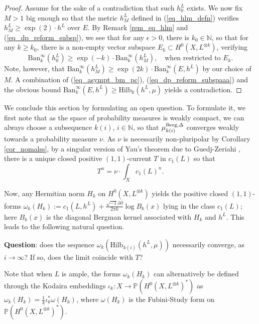 \documentclass[12pt]{article}
\numberwithin{equation}{section}
\theoremstyle{theorem}
\theoremstyle{definition}
\theoremstyle{remark}
\newcommand{\imun} {\sqrt{-1}}
\newcommand{\nat}{\mathbb{N}}
\newcommand{\dbar}{ \overline{\partial} }
\begin{document}
	\begin{proof}
		Assume for the sake of a contradiction that such $h^L_0$ exists.
		We now fix $M > 1$ big enough so that the metric $h^L_M$ defined in (\ref{eq_hlm_defn}) verifies $h^L_M \geq \exp(2) \cdot h^L$ over $E$.
		By Remark \ref{rem_eq_hlm} and (\ref{eq_dp_reform_subsp}), we see that for any $\epsilon > 0$, there is $k_0 \in \nat$, so that for any $k \geq k_0$, there is a non-empty vector subspace $E_k \subset H^0(X, L^{\otimes k})$, verifying 
		\begin{equation}\label{eq_dp_reform_subspaaa}
			{\textrm{Ban}}_k^{\infty}(h^L_0) \geq \exp(-k) \cdot {\textrm{Ban}}_k^{\infty}(h^L_M), \quad \text{when restricted to } E_k.
		\end{equation}
		Note, however, that ${\textrm{Ban}}_k^{\infty}(h^L_M) \geq \exp(2k) \cdot {\textrm{Ban}}_k^{\infty}(E, h^L)$ by our choice of $M$.
		A combination of (\ref{eq_asympt_bm_pc}), (\ref{eq_dp_reform_subspaaa}) and the obvious bound ${\textrm{Ban}}_k^{\infty}(E, h^L)
			\geq 
			{\textrm{Hilb}}_k(h^L, \mu)$ yields a contradiction.
	\end{proof}
	\par 
	We conclude this section by formulating an open question.
	To formulate it, we first note that as the space of probability measures is weakly compact, we can always choose a subsequence $k(i)$, $i \in \nat$, so that $\mu_{k(i)}^{\rm{Berg}, \Delta}$ converges weakly towards a probability measure $\nu$.
	As $\nu$ is necessarily non-pluripolar by Corollary \ref{cor_nomalss}, by a singular version of Yau's theorem \cite{YauThm} due to Guedj-Zeriahi \cite[Theorem 11.18]{GuedjZeriahBook}, there is a unique closed positive $(1, 1)$-current $T$ in $c_1(L)$ so that 
	\begin{equation}\label{eq_calabi}
		T^n = \nu \cdot \int_X c_1(L)^n.
	\end{equation}
	\par 
	Now, any Hermitian norm $H_k$ on $H^0(X, L^{\otimes k})$ yields the positive closed $(1, 1)$-forms $\omega_k(H_k) := c_1(L, h^L) + \frac{\imun \partial \dbar}{2 \pi k} \log B_k(x)$ lying in the class $c_1(L)$; here $B_k(x)$ is the diagonal Bergman kernel associated with $H_k$ and $h^L$. 
	This leads to the following natural question.
	\par 
	\textbf{Question}: does the sequence $\omega_k({\textrm{Hilb}}_{k(i)}(h^L, \mu))$ necessarily converge, as $i \to \infty$? If so, does the limit coincide with $T$?
	\par 
	Note that when $L$ is ample, the forms $\omega_k(H_k)$ can alternatively be defined through the Kodaira embeddings $\iota_k : X \to \mathbb{P}(H^0(X, L^{\otimes k})^*)$ as $\omega_k(H_k) = \frac{1}{k} \iota_k^* \omega(H_k)$, where $\omega(H_k)$ is the Fubini-Study form on $\mathbb{P}(H^0(X, L^{\otimes k})^*)$.
\end{document}
